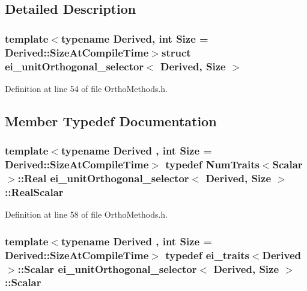 \subsection{Detailed Description}
\subsubsection*{template$<$typename Derived, int Size = Derived\-::\-Size\-At\-Compile\-Time$>$struct ei\-\_\-unit\-Orthogonal\-\_\-selector$<$ Derived, Size $>$}



Definition at line 54 of file Ortho\-Methods.\-h.



\subsection{Member Typedef Documentation}
\hypertarget{structei__unit_orthogonal__selector_aa5b02d2e377427f0cedff2b12bc9f94f}{
\subsubsection[{Real\-Scalar}]{\setlength{\rightskip}{0pt plus 5cm}template$<$typename Derived , int Size = Derived\-::\-Size\-At\-Compile\-Time$>$ typedef {\bf Num\-Traits}$<${\bf Scalar}$>$\-::Real {\bf ei\-\_\-unit\-Orthogonal\-\_\-selector}$<$ Derived, Size $>$\-::{\bf Real\-Scalar}}}\label{structei__unit_orthogonal__selector_aa5b02d2e377427f0cedff2b12bc9f94f}


Definition at line 58 of file Ortho\-Methods.\-h.

\hypertarget{structei__unit_orthogonal__selector_ad14f3df81f000afc8dba3070f555ebc2}{
\subsubsection[{Scalar}]{\setlength{\rightskip}{0pt plus 5cm}template$<$typename Derived , int Size = Derived\-::\-Size\-At\-Compile\-Time$>$ typedef {\bf ei\-\_\-traits}$<$Derived$>$\-::{\bf Scalar} {\bf ei\-\_\-unit\-Orthogonal\-\_\-selector}$<$ Derived, Size $>$\-::{\bf Scalar}}}\label{structei__unit_orthogonal__selector_ad14f3df81f000afc8dba3070f555ebc2}


